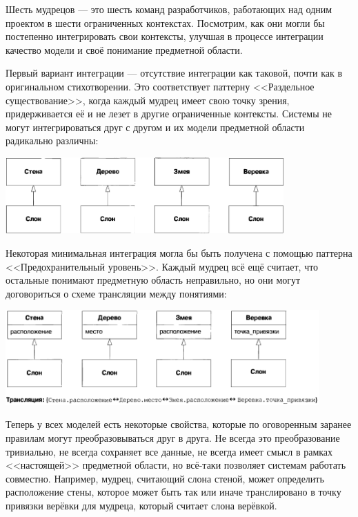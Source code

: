 \documentclass[a5paper]{article}
\begin{document}
Шесть мудрецов --- это шесть команд разработчиков, работающих над одним проектом в шести ограниченных контекстах. Посмотрим, как они могли бы постепенно интегрировать свои контексты, улучшая в процессе интеграции качество модели и своё понимание предметной области.

Первый вариант интеграции --- отсутствие интеграции как таковой, почти как в оригинальном стихотворении. Это соответствует паттерну <<Раздельное существование>>, когда каждый мудрец имеет свою точку зрения, придерживается её и не лезет в другие ограниченные контексты. Системы не могут интегрироваться друг с другом и их модели предметной области радикально различны:

\begin{center}
    \includegraphics[width=0.8\textwidth]{elephantSeparateWays.png}
\end{center}

Некоторая минимальная интеграция могла бы быть получена с помощью паттерна <<Предохранительный уровень>>. Каждый мудрец всё ещё считает, что остальные понимают предметную область неправильно, но они могут договориться о схеме трансляции между понятиями: 

\begin{center}
    \includegraphics[width=0.9\textwidth]{elephantAnticorruptionLayer.png}
\end{center}

Теперь у всех моделей есть некоторые свойства, которые по оговоренным заранее правилам могут преобразовываться друг в друга. Не всегда это преобразование тривиально, не всегда сохраняет все данные, не всегда имеет смысл в рамках <<настоящей>> предметной области, но всё-таки позволяет системам работать совместно. Например, мудрец, считающий слона стеной, может определить расположение стены, которое может быть так или иначе транслировано в точку привязки верёвки для мудреца, который считает слона верёвкой. 
\end{document}
